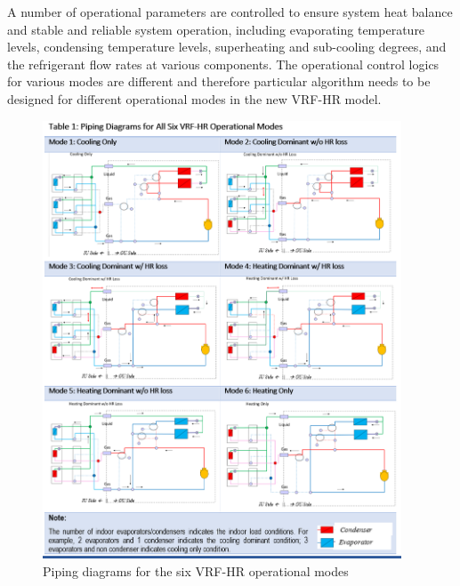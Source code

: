 A number of operational parameters are controlled to ensure system heat balance and stable and reliable system operation, including evaporating temperature levels, condensing temperature levels, superheating and sub-cooling degrees, and the refrigerant flow rates at various components. The operational control logics for various modes are different and therefore particular algorithm needs to be designed for different operational modes in the new VRF-HR model.

\begin{figure}[hbtp] %
\centering
\includegraphics[width=0.95\textwidth, keepaspectratio=true]{media/VRF-HR-Chart-Piping.png}
\caption{Piping diagrams for the six VRF-HR operational modes \label{fig:VRF-HR-Chart-Piping}}
\end{figure}

